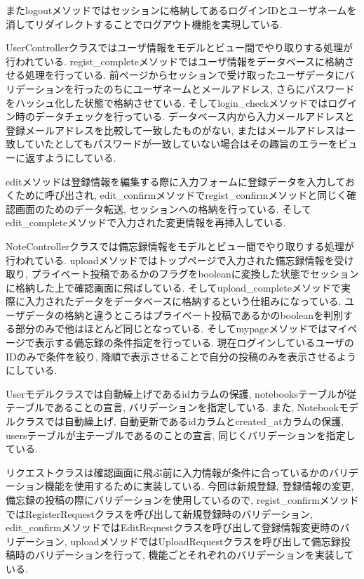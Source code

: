 \documentclass[submit,techrep]{ipsj}
\begin{document}
またlogoutメソッドではセッションに格納してあるログインIDとユーザネームを消してリダイレクトすることでログアウト機能を実現している. 

UserControllerクラスではユーザ情報をモデルとビュー間でやり取りする処理が行われている. regist\_completeメソッドではユーザ情報をデータベースに格納させる処理を行っている. 前ページからセッションで受け取ったユーザデータにバリデーションを行ったのちにユーザネームとメールアドレス, さらにパスワードをハッシュ化した状態で格納させている. 
そしてlogin\_checkメソッドではログイン時のデータチェックを行っている. データベース内から入力メールアドレスと登録メールアドレスを比較して一致したものがない, またはメールアドレスは一致していたとしてもパスワードが一致していない場合はその趣旨のエラーをビューに返すようにしている. 

editメソッドは登録情報を編集する際に入力フォームに登録データを入力しておくために呼び出され, edit\_confirmメソッドでregist\_confirmメソッドと同じく確認画面のためのデータ転送, セッションへの格納を行っている. そしてedit\_completeメソッドで入力された変更情報を再挿入している. 

NoteControllerクラスでは備忘録情報をモデルとビュー間でやり取りする処理が行われている. uploadメソッドではトップページで入力された備忘録情報を受け取り, プライベート投稿であるかのフラグをbooleanに変換した状態でセッションに格納した上で確認画面に飛ばしている. 
そしてupload\_completeメソッドで実際に入力されたデータをデータベースに格納するという仕組みになっている. ユーザデータの格納と違うところはプライベート投稿であるかのbooleanを判別する部分のみで他はほとんど同じとなっている. そしてmypageメソッドではマイページで表示する備忘録の条件指定を行っている. 現在ログインしているユーザのIDのみで条件を絞り, 降順で表示させることで自分の投稿のみを表示させるようにしている. 

Userモデルクラスでは自動繰上げであるidカラムの保護, notebooksテーブルが従テーブルであることの宣言, バリデーションを指定している. 
また, Notebookモデルクラスでは自動繰上げ, 自動更新であるidカラムとcreated\_atカラムの保護, usersテーブルが主テーブルであるのことの宣言, 同じくバリデーションを指定している. 

リクエストクラスは確認画面に飛ぶ前に入力情報が条件に合っているかのバリデーション機能を使用するために実装している. 今回は新規登録, 登録情報の変更, 備忘録の投稿の際にバリデーションを使用しているので, regist\_confirmメソッドではRegisterRequestクラスを呼び出して新規登録時のバリデーション, edit\_confirmメソッドではEditRequestクラスを呼び出して登録情報変更時のバリデーション, uploadメソッドではUploadRequestクラスを呼び出して備忘録投稿時のバリデーションを行って, 機能ごとそれぞれのバリデーションを実装している. 
\end{document}
